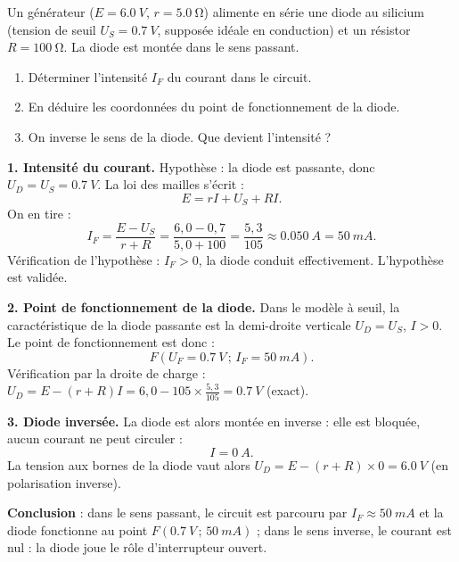\documentclass[11pt]{article}
\begin{document}
\begin{exoresolu}
Un générateur ($E = \SI{6,0}{V}$, $r = \SI{5,0}{\ohm}$) alimente en série une diode au silicium (tension de seuil $U_S = \SI{0,7}{V}$, supposée idéale en conduction) et un résistor $R = \SI{100}{\ohm}$. La diode est montée dans le sens passant.
\begin{enumerate}
\item Déterminer l'intensité $I_F$ du courant dans le circuit.
\item En déduire les coordonnées du point de fonctionnement de la diode.
\item On inverse le sens de la diode. Que devient l'intensité ?
\end{enumerate}
\tcblower
\textbf{1. Intensité du courant.} Hypothèse : la diode est passante, donc $U_D = U_S = \SI{0,7}{V}$. La loi des mailles s'écrit :
\[ E = rI + U_S + RI. \]
On en tire :
\[ I_F = \frac{E - U_S}{r + R} = \frac{6{,}0 - 0{,}7}{5{,}0 + 100} = \frac{5{,}3}{105} \approx \SI{0,050}{A} = \SI{50}{mA}. \]
Vérification de l'hypothèse : $I_F > 0$, la diode conduit effectivement. L'hypothèse est validée.

\textbf{2. Point de fonctionnement de la diode.} Dans le modèle à seuil, la caractéristique de la diode passante est la demi-droite verticale $U_D = U_S$, $I > 0$. Le point de fonctionnement est donc :
\[ F\left(U_F = \SI{0,7}{V}\,;\,I_F = \SI{50}{mA}\right). \]
Vérification par la droite de charge : $U_D = E - (r+R)I = 6{,}0 - 105 \times \frac{5{,}3}{105} = \SI{0,7}{V}$ (exact).

\textbf{3. Diode inversée.} La diode est alors montée en inverse : elle est bloquée, aucun courant ne peut circuler :
\[ I = \SI{0}{A}. \]
La tension aux bornes de la diode vaut alors $U_D = E - (r+R)\times 0 = \SI{6,0}{V}$ (en polarisation inverse).

\textbf{Conclusion} : dans le sens passant, le circuit est parcouru par $I_F \approx \SI{50}{mA}$ et la diode fonctionne au point $F(\SI{0,7}{V}\,;\,\SI{50}{mA})$ ; dans le sens inverse, le courant est nul : la diode joue le rôle d'interrupteur ouvert.
\end{exoresolu}
\end{document}

